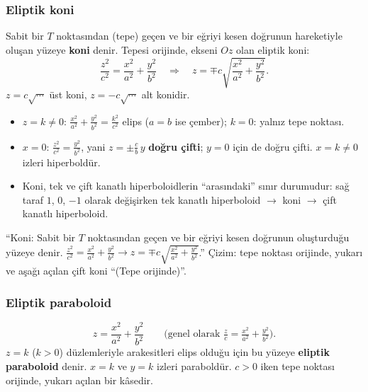 \subsubsection{Eliptik koni}

\begin{tanim}[Koni]
Sabit bir $T$ noktasından (tepe) geçen ve bir eğriyi kesen doğrunun hareketiyle oluşan yüzeye \textbf{koni} denir. Tepesi orijinde, ekseni $Oz$ olan eliptik koni:
\[ \frac{z^2}{c^2}=\frac{x^2}{a^2}+\frac{y^2}{b^2}\quad\Longrightarrow\quad z=\mp c\sqrt{\frac{x^2}{a^2}+\frac{y^2}{b^2}} . \]
$z=c\sqrt{\cdots}$ üst koni, $z=-c\sqrt{\cdots}$ alt konidir.
\end{tanim}
\begin{itemize}
  \item $z=k\neq0$: $\frac{x^2}{a^2}+\frac{y^2}{b^2}=\frac{k^2}{c^2}$ elips ($a=b$ ise çember); $k=0$: yalnız tepe noktası.
  \item $x=0$: $\frac{z^2}{c^2}=\frac{y^2}{b^2}$, yani $z=\pm\frac cb\,y$ \textbf{doğru çifti}; $y=0$ için de doğru çifti. $x=k\neq0$ izleri hiperboldür.
  \item Koni, tek ve çift kanatlı hiperboloidlerin ``arasındaki'' sınır durumudur: sağ taraf $1$, $0$, $-1$ olarak değişirken tek kanatlı hiperboloid $\to$ koni $\to$ çift kanatlı hiperboloid.
\end{itemize}

\begin{tahta}
``Koni: Sabit bir $T$ noktasından geçen ve bir eğriyi kesen doğrunun oluşturduğu yüzeye denir. $\frac{z^2}{c^2}=\frac{x^2}{a^2}+\frac{y^2}{b^2}\to z=\mp c\sqrt{\frac{x^2}{a^2}+\frac{y^2}{b^2}}$.'' Çizim: tepe noktası orijinde, yukarı ve aşağı açılan çift koni ``(Tepe orijinde)''.
\end{tahta}

\subsubsection{Eliptik paraboloid}

\begin{tanim}
\[ z=\frac{x^2}{a^2}+\frac{y^2}{b^2}\qquad\text{(genel olarak } \tfrac{z}{c}=\tfrac{x^2}{a^2}+\tfrac{y^2}{b^2}\text{)} . \]
$z=k$ ($k>0$) düzlemleriyle arakesitleri elips olduğu için bu yüzeye \textbf{eliptik paraboloid} denir. $x=k$ ve $y=k$ izleri paraboldür. $c>0$ iken tepe noktası orijinde, yukarı açılan bir kâsedir.
\end{tanim}

